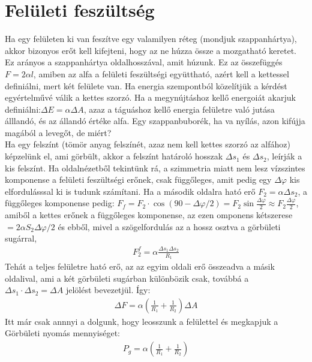 \documentclass{article}
\begin{document}
\section{Felületi feszültség}
Ha egy felületen ki van feszítve egy valamilyen réteg (mondjuk szappanhártya), akkor bizonyos erőt kell kifejteni, hogy az ne húzza össze a mozgatható keretet. Ez arányos a szappanhártya oldalhosszával, amit húzunk. Ez az összefüggés $F=2\alpha l$, amiben az alfa a felületi feszültségi együttható, azért kell a kettessel definiálni, mert két felülete van. Ha energia szempontból közelítjük a kérdést egyértelművé válik a kettes szorzó. Ha a megynújtáshoz kellő energoiát akarjuk definiálni:$\Delta E = \alpha \Delta A$, azaz a táguáshoz kellő energia felületre való jutása álllandó, és az állandó értéke alfa. Egy szappanbuborék, ha va nyílás, azon kifújja magából a levegőt, de miért?\\
Ha egy felszínt (tömör anyag felszínét, azaz nem kell kettes szorzó az alfához) képzelünk el, ami görbült, akkor a felszínt határoló hosszak $\Delta s_1$ és $\Delta s_2$, leírják a kis felszínt. Ha oldalnézetből tekintünk rá, a szimmetria miatt nem lesz vízszintes komponense a felületi feszültségi erőnek, csak függőleges, amit pedig egy $\Delta \varphi$ kis elfordulásssal ki is tudunk számítani. Ha a második oldalra ható erő $F_2 = \alpha \Delta s_2$, a függőleges komponense pedig: $F_{f} = F_2 \cdot \cos(90-\Delta\varphi/2) = F_2 \sin \frac{\Delta \varphi}{2} \approx F_2 \frac{\Delta \varphi}{2}$, amiből a kettes erőnek a függőleges komponense, az ezen omponens kétszerese $=2\alpha S_2 \Delta \varphi/2$ és ebből, mivel a szögelfordulás az a hossz osztva a görbületi sugárral, 
\begin{align*}
F_2^{f} = \alpha \frac{\Delta s_1 \Delta s_2}{R_1}
\end{align*}
Tehát a teljes felületre ható erő, az az egyim oldali erő összeadva a másik oldalival, ami a két görbületi sugárban különbözik csak, továbbá a $\Delta s_1 \cdot \Delta s_2 = \Delta A$ jelölést bevezetjül. Így:
\begin{align*}
\Delta F = \alpha \left( \frac{1}{R_1} + \frac{1}{R_2}\right) \Delta A
\end{align*}
Itt már csak annnyi a dolgunk, hogy leosszunk a felülettel és megkapjuk a Görbületi nyomás mennyiséget:
\begin{align*}
P_g = \alpha \left( \frac{1}{R_1} + \frac{1}{R_2}\right)
\end{align*}
\newpage
\end{document}
